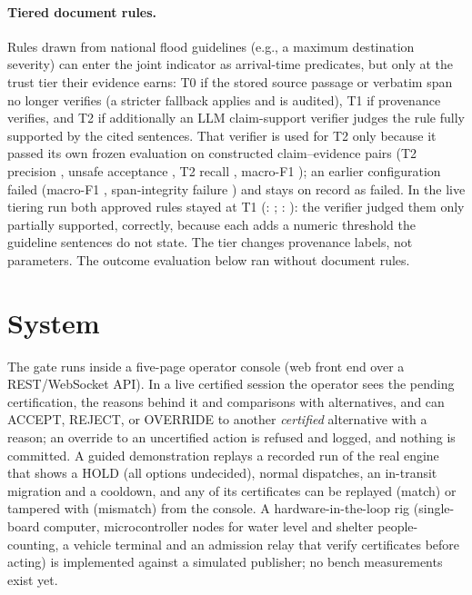 \documentclass[letterpaper]{article}
\begin{document}
\paragraph{Tiered document rules.} Rules drawn from national flood guidelines \citep{ndma2008floods}
(e.g., a maximum destination severity) can enter the joint indicator as arrival-time predicates, but only
at the trust tier their evidence earns: T0 if the stored source passage or verbatim span no longer
verifies (a stricter fallback applies and is audited), T1 if provenance verifies, and T2 if additionally
an LLM claim-support verifier \citep{gptoss2025} judges the rule fully supported by the cited sentences.
That verifier is used for T2 only because it passed its own frozen evaluation on \nVerPairs{} constructed
claim--evidence pairs (T2 precision \nVerTwoPrecision, unsafe acceptance \nVerTwoUnsafe, T2 recall
\nVerTwoRecall, macro-F1 \nVerMacroFone); an earlier configuration failed (macro-F1 \nVerOldMacroFone,
span-integrity failure \nVerOldSpanFail) and stays on record as failed. In the live tiering run both
approved rules stayed at T1 (\nTierRuleOne: \nTierOne; \nTierRuleTwo: \nTierTwo): the verifier judged them only partially
supported, correctly, because each adds a numeric threshold the guideline sentences do not state.
The tier changes provenance labels, not parameters. The outcome evaluation below ran without document
rules.

\section{System}

The gate runs inside a five-page operator console (web front end over a REST/WebSocket API). In a live
certified session the operator sees the pending certification, the reasons behind it and comparisons
with alternatives, and can ACCEPT, REJECT, or OVERRIDE to another \emph{certified} alternative with a
reason; an override to an uncertified action is refused and logged, and nothing is committed. A guided
demonstration replays a recorded run of the real engine that shows a HOLD (all options undecided), normal
dispatches, an in-transit migration and a cooldown, and any of its certificates can be replayed (match)
or tampered with (mismatch) from the console. A hardware-in-the-loop rig (single-board computer,
microcontroller nodes for water level and shelter people-counting, a vehicle terminal and an admission
relay that verify certificates before acting) is implemented against a simulated publisher; no bench
measurements exist yet.
\end{document}
